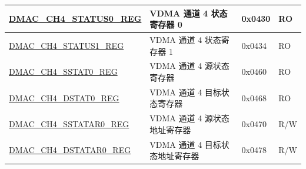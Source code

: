 \begin{longtable}{ | L{7.8cm} | L{6.2cm} | L{1.3cm} | L{1cm} | }
\hyperref[regdesc:DMACCHNSTATUS0REG]{DMAC\_CH4\_STATUS0\_REG} & VDMA 通道 4 状态寄存器 0 & 0x0430 & RO \\ \hline
\hyperref[regdesc:DMACCHNSTATUS1REG]{DMAC\_CH4\_STATUS1\_REG} & VDMA 通道 4 状态寄存器 1 & 0x0434 & RO \\ \hline
\hyperref[regdesc:DMACCHNSSTAT0REG]{DMAC\_CH4\_SSTAT0\_REG} & VDMA 通道 4 源状态寄存器 & 0x0460 & RO \\ \hline
\hyperref[regdesc:DMACCHNDSTAT0REG]{DMAC\_CH4\_DSTAT0\_REG} & VDMA 通道 4 目标状态寄存器 & 0x0468 & RO \\ \hline
\hyperref[regdesc:DMACCHNSSTATAR0REG]{DMAC\_CH4\_SSTATAR0\_REG} & VDMA 通道 4 源状态地址寄存器  & 0x0470 & R/W \\ \hline
\hyperref[regdesc:DMACCHNDSTATAR0REG]{DMAC\_CH4\_DSTATAR0\_REG} & VDMA 通道 4 目标状态地址寄存器  & 0x0478 & R/W \\ \hline

\end{longtable}
